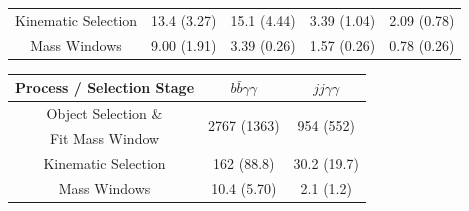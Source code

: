\begin{table}[!ht]
\begin{center}
{\begin{tabular}{|c|c|c|c|c|}
Kinematic Selection                  &  13.4 (3.27)                             &  15.1  (4.44)                            &  3.39  (1.04)                                        &  2.09 (0.78)       \\ 
Mass Windows                         &  9.00 (1.91)                              &  3.39  (0.26)                            &  1.57 (0.26)                                         &  0.78 (0.26)       \\  \hline
\end{tabular}
}
\vspace{2mm}
\begin{tabular}{|c|c|c|}
\hline
Process / Selection Stage           &  $b\bar{b}\gamma\gamma$   & $jj\gamma\gamma$            \\  \hline
Object Selection \&                 &  \multirow{2}{*}{2767 (1363)} & \multirow{2}{*}{954 (552)} \\ 
Fit Mass Window                     &                             &                              \\ 
Kinematic Selection                 &  162  (88.8)                 &  30.2  (19.7)                      \\ 
Mass Windows                        &  10.4 (5.70)                &  2.1 (1.2)                     \\  \hline
\end{tabular}
\vspace{2mm}
\end{center}
\end{table}
